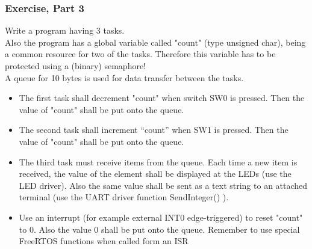 \subsubsection{Exercise, Part 3}
Write a program having 3 tasks.\\

\noindent Also the program has a global variable called "count" (type unsigned char), being a common resource for two of the tasks. Therefore this variable has to be protected using a (binary) semaphore!\\

\noindent A queue for 10 bytes is used for data transfer between the tasks.
\begin{itemize}
	\item The first task shall decrement "count" when switch SW0 is pressed.
	Then the value of "count" shall be put onto the queue.
	\item The second task shall increment “count” when SW1 is pressed.
	Then the value of "count" shall be put onto the queue.
	\item The third task must receive items from the queue.
	Each time a new item is received, the value of the element shall be displayed at the LEDs (use
	the LED driver). Also the same value shall be sent as a text string to an attached terminal (use
	the UART driver function SendInteger() ).
	\item Use an interrupt (for example external INT0 edge-triggered) to reset "count" to 0.
	Also the value 0 shall be put onto the queue.
	Remember to use special FreeRTOS functions when called form an ISR
\end{itemize}

